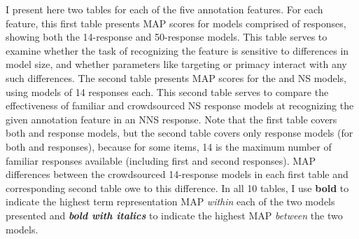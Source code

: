 I present here two tables for each of the five annotation features. For each feature, this first table presents MAP scores for models comprised of  responses, showing both the 14-response and 50-response models. This table serves to examine whether the task of recognizing the feature is sensitive to differences in model size, and whether parameters like targeting or primacy interact with any such differences. The second table presents MAP scores for the  and  NS models, using models of 14 responses each. This second table serves to compare the effectiveness of familiar and crowdsourced NS response models at recognizing the given annotation feature in an NNS response. Note that the first table covers both  and  response models, but the second table covers only  response models (for both  and  responses), because for some items, 14 is the maximum number of familiar responses available (including first and second responses). MAP differences between the crowdsourced 14-response models in each first table and corresponding second table owe to this difference. In all 10 tables, I use \textbf{bold} to indicate the highest term representation MAP \textit{within} each of the two models presented and \textit{\textbf{bold with italics}} to indicate the highest MAP \textit{between} the two models.

